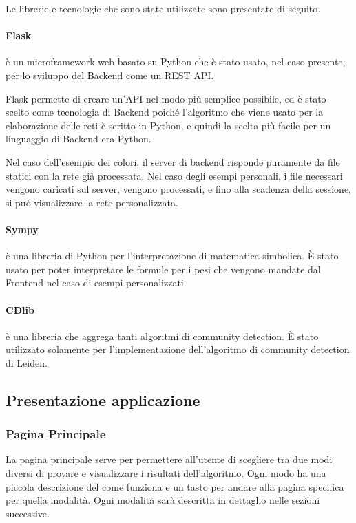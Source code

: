 \documentclass[a4paper,12pt]{report}
\begin{document}
			Le librerie e tecnologie che sono state utilizzate sono presentate di seguito.
			
			\paragraph*{Flask} è un microframework web basato su Python che è stato usato, nel caso presente, per lo sviluppo del Backend come un REST API. \cite{flaskforeword}

				Flask permette di creare un’API nel modo più semplice possibile, ed è stato scelto come tecnologia di Backend poiché l'algoritmo che viene usato per la elaborazione delle reti è scritto in Python, e quindi la scelta più facile per un linguaggio di Backend era Python. 

				Nel caso dell'esempio dei colori, il server di backend risponde puramente da file statici con la rete già processata. Nel caso degli esempi personali, i file necessari vengono caricati sul server, vengono processati, e fino alla scadenza della sessione, si può visualizzare la rete personalizzata.

			\paragraph*{Sympy} è una libreria di Python per l'interpretazione di matematica simbolica. È stato usato per poter interpretare le formule per i pesi che vengono mandate dal Frontend nel caso di esempi personalizzati. \cite{sympy}

			\paragraph*{CDlib} è una libreria che aggrega tanti algoritmi di community detection. È stato utilizzato solamente per l'implementazione dell'algoritmo di community detection di Leiden. \cite{cdlib}
			
		\subsection{Presentazione applicazione}
			
			\subsubsection{Pagina Principale}
			La pagina principale serve per permettere all'utente di scegliere tra due modi diversi di provare e visualizzare i risultati dell'algoritmo. Ogni modo ha una piccola descrizione del come funziona e un tasto per andare alla pagina specifica per quella modalità. Ogni modalità sarà descritta in dettaglio nelle sezioni successive.
\end{document}
